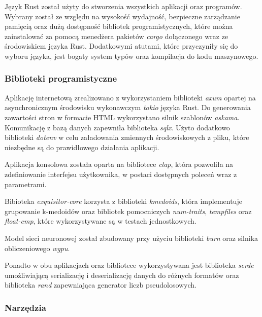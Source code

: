             Język Rust został użyty do stworzenia wszystkich aplikacji oraz programów. Wybrany został ze względu na wysokość wydajność, bezpieczne zarządzanie pamięcią oraz dużą dostępność bibliotek programistycznych, które można zainstalować za pomocą menedżera pakietów \textit{cargo}\cite{Rust:cargo} dołączonego wraz ze środowiskiem języka Rust. Dodatkowymi atutami, które przyczyniły się do wyboru języka, jest bogaty system typów oraz kompilacja do kodu maszynowego. 

        \subsubsection{Biblioteki programistyczne}

            Aplikację internetową zrealizowano z wykorzystaniem biblioteki \textit{axum}\cite{Rust:axum} opartej na asynchronicznym środowisku wykonawczym \textit{tokio}\cite{Rust:tokio} języka Rust.
            Do generowania zawartości stron w formacie HTML wykorzystano silnik szablonów \textit{askama}\cite{Rust:askama}. Komunikację z bazą danych zapewniła biblioteka \textit{sqlx}\cite{Rust:sqlx}. Użyto dodatkowo biblioteki \textit{dotenv}\cite{Rust:dotenv} w celu załadowania zmiennych środowiskowych z pliku, które niezbędne są do prawidłowego działania aplikacji.

            Aplikacja konsolowa została oparta na bibliotece \textit{clap}\cite{Rust:clap}, która pozwoliła na zdefiniowanie interfejsu użytkownika, w postaci dostępnych poleceń wraz z parametrami.

            Bibioteka \textit{exquisitor-core} korzysta z biblioteki \textit{kmedoids}\cite{Schubert:2022}, która implementuje grupowanie k-medoidów oraz bibliotek pomocniczych \textit{num-traits}, \textit{tempfiles} oraz \textit{float-cmp}, które wykorzystywane są w testach jednostkowych.

            Model sieci neuronowej został zbudowany przy użyciu biblioteki \textit{burn}\cite{Rust:burn} oraz silnika obliczeniowego \textit{wgpu}.

            Ponadto w obu aplikacjach oraz bibliotece wykorzystywana jest biblioteka \textit{serde}\cite{Rust:serde} umożliwiającą serializację i deserializację danych do różnych formatów oraz biblioteka \textit{rand}\cite{Rust:rand} zapewniająca generator liczb pseudolosowych.

        \subsubsection{Narzędzia}
            
